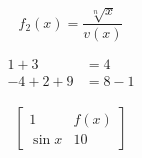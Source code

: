 \documentclass[12pt, oneside]{book}
\begin{document}
        \begin{equation*}
          f_2(x) = \frac{\sqrt[n]{x}}{v(x)}
        \end{equation*}

        \begin{align*}
               1 + 3 &= 4 \\
          -4 + 2 + 9 &= 8 - 1
        \end{align*}

        \begin{align*}
          \left[
          \begin{matrix}
                 1 & f(x) \\
            \sin x & 10
          \end{matrix}
          \right]
        \end{align*}
\end{document}
